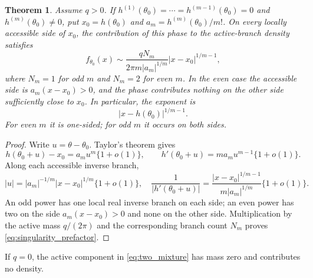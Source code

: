 \documentclass[11pt]{amsart}
\numberwithin{equation}{section}\setcounter{tocdepth}{3}\setcounter{secnumdepth}{3}
\newtheorem{theorem}{Theorem}[section]\newtheorem{proposition}[theorem]{Proposition}
\begin{document}
\begin{theorem}\label{thm:singularity}
Assume $q>0$.  If $h^{(1)}(\theta_0)=\cdots=h^{(m-1)}(\theta_0)=0$ and
$h^{(m)}(\theta_0)\ne0$, put $x_0=h(\theta_0)$ and
$a_m=h^{(m)}(\theta_0)/m!$.  On every locally accessible side of $x_0$, the
contribution of this phase to the active-branch density satisfies
\begin{equation}
 f_{\theta_0}(x)\sim
 \frac{qN_m}{2\pi m|a_m|^{1/m}}|x-x_0|^{1/m-1},
 \label{eq:singularity_prefactor}
\end{equation}
where $N_m=1$ for odd $m$ and $N_m=2$ for even $m$.  In the even case the
accessible side is $a_m(x-x_0)>0$, and the phase contributes nothing on the other
side sufficiently close to $x_0$.  In particular, the exponent is
\begin{equation}|x-h(\theta_0)|^{1/m-1}.\label{eq:singularity_exponent}\end{equation}
For even $m$ it is one-sided; for odd $m$ it occurs on both sides.
\end{theorem}
\begin{proof}
Write $u=\theta-\theta_0$.  Taylor's theorem gives
\begin{equation}
 h(\theta_0+u)-x_0=a_mu^m\{1+o(1)\},\qquad
 h'(\theta_0+u)=ma_mu^{m-1}\{1+o(1)\}.
 \label{eq:singularity_taylor_pair}
\end{equation}
Along each accessible inverse branch,
\begin{equation}
 |u|=|a_m|^{-1/m}|x-x_0|^{1/m}\{1+o(1)\},
 \quad
 \frac1{|h'(\theta_0+u)|}
 =\frac{|x-x_0|^{1/m-1}}{m|a_m|^{1/m}}\{1+o(1)\}.
 \label{eq:singularity_inverse_derivative}
\end{equation}
An odd power has one local real inverse branch on each side; an even power has two on
the side $a_m(x-x_0)>0$ and none on the other side.  Multiplication by the active mass
$q/(2\pi)$ and the corresponding branch count $N_m$ proves
\eqref{eq:singularity_prefactor}.
\end{proof}
If $q=0$, the active component in \eqref{eq:two_mixture} has mass zero and contributes no
density.
\end{document}
